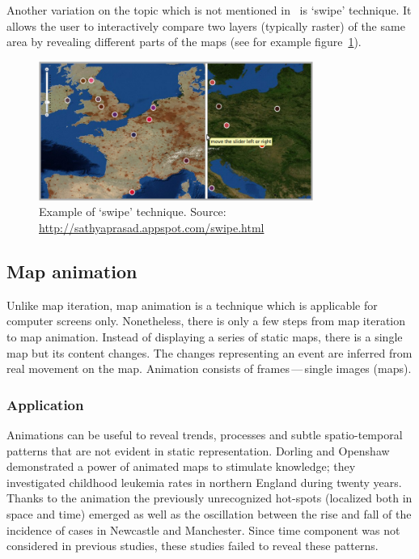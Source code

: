 \documentclass[a4paper,12pt,oneside]{book}
\newcommand{\dash}{\mbox{\,---\,}}
\begin{document}
Another variation on the topic which is not mentioned in~\cite{andrienko2003exploratory}
is `swipe' technique.
It allows the user to interactively compare two layers (typically raster)
of the same area by revealing different parts of the maps (see for example figure~\ref{fig:swipe}).


\begin{figure}[h!]
  \centering
  \includegraphics[width=0.8\textwidth]{./images/swipe_example.png}
  \caption[Example of `swipe' technique]
  {Example of `swipe' technique. Source: \url{http://sathyaprasad.appspot.com/swipe.html}}
  \label{fig:swipe}
\end{figure}


\subsection{Map animation}
\label{sec:mapAnimation}
Unlike map iteration, map animation is a technique which is applicable for computer screens only.
Nonetheless, there is only a few steps from map iteration to map animation.
Instead of displaying a series of static maps, there is a single map but its content changes.
The changes representing an event are inferred from real movement on the map.
Animation consists of frames\dash single images (maps).

\subsubsection{Application}
Animations can be useful to reveal trends, processes and subtle spatio-temporal patterns
that are not evident in static representation. Dorling and Openshaw~\cite{dorling1993using}
demonstrated a power of animated maps to stimulate knowledge;
they investigated childhood leukemia rates in northern England during twenty years.
Thanks to the animation the previously unrecognized hot-spots (localized both in space and time) emerged
as well as the oscillation between the rise and fall of the incidence of
cases in Newcastle and Manchester. Since time component was not considered in previous studies,
these studies failed to reveal these patterns.
\end{document}
